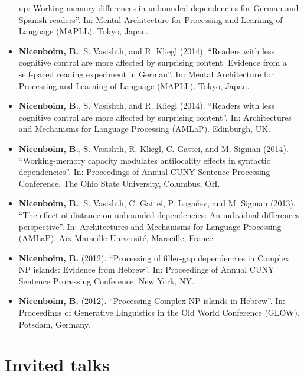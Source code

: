 \documentclass[]{article}
\begin{document}
\begin{itemize}
  up: Working memory differences in unbounded dependencies for German
  and Spanish readers''. In: Mental Architecture for Processing and
  Learning of Language (MAPLL). Tokyo, Japan.
\item
  \textbf{Nicenboim, B.}, S. Vasishth, and R. Kliegl (2014). ``Readers
  with less cognitive control are more affected by surprising content:
  Evidence from a self-paced reading experiment in German''. In: Mental
  Architecture for Processing and Learning of Language (MAPLL). Tokyo,
  Japan.
\item
  \textbf{Nicenboim, B.}, S. Vasishth, and R. Kliegl (2014). ``Readers
  with less cognitive control are more affected by surprising content''.
  In: Architectures and Mechanisms for Language Processing (AMLaP).
  Edinburgh, UK.
\item
  \textbf{Nicenboim, B.}, S. Vasishth, R. Kliegl, C. Gattei, and M.
  Sigman (2014). ``Working-memory capacity modulates antilocality
  effects in syntactic dependencies''. In: Proceedings of Annual CUNY
  Sentence Processing Conference. The Ohio State University, Columbus,
  OH.
\item
  \textbf{Nicenboim, B.}, S. Vasishth, C. Gattei, P. Logačev, and M.
  Sigman (2013). ``The effect of distance on unbounded dependencies: An
  individual differences perspective''. In: Architectures and Mechanisms
  for Language Processing (AMLaP). Aix-Marseille Université, Marseille,
  France.
\item
  \textbf{Nicenboim, B.} (2012). ``Processing of filler-gap dependencies
  in Complex NP islands: Evidence from Hebrew''. In: Proceedings of
  Annual CUNY Sentence Processing Conference, New York, NY.
\item
  \textbf{Nicenboim, B.} (2012). ``Processing Complex NP islands in
  Hebrew''. In: Proceedings of Generative Linguistics in the Old World
  Conference (GLOW), Potsdam, Germany.

   
\end{itemize}

\hypertarget{invited-talks}{%
\section{Invited talks}\label{invited-talks}}
\end{document}
